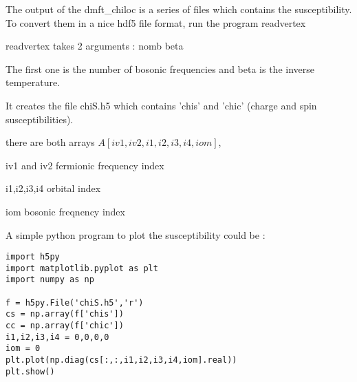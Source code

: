\documentclass{book}
\begin{document}
\begin{enumerate}
The output of the dmft\_chiloc is a series of files which contains the susceptibility. To convert them in a nice hdf5 file format, run the program readvertex

readvertex takes 2 arguments : nomb beta

The first one is the number of bosonic frequencies and   beta is  the inverse temperature.

It creates the file chiS.h5 which contains 'chis' and 'chic' (charge and spin susceptibilities).

there are both arrays $A[iv1,iv2,i1,i2,i3,i4,iom]$,

iv1 and iv2 fermionic frequency index

i1,i2,i3,i4 orbital index

iom bosonic freqnency index
\end{enumerate}


A simple python program to plot the susceptibility could be  :

\begin{lstlisting}
import h5py
import matplotlib.pyplot as plt
import numpy as np

f = h5py.File('chiS.h5','r')
cs = np.array(f['chis'])
cc = np.array(f['chic'])
i1,i2,i3,i4 = 0,0,0,0
iom = 0
plt.plot(np.diag(cs[:,:,i1,i2,i3,i4,iom].real))
plt.show()
\end{lstlisting}
\end{document}
